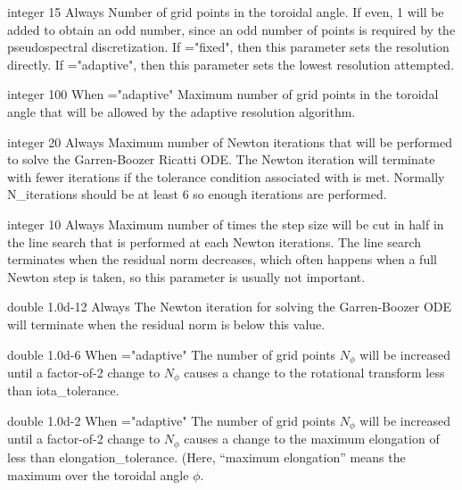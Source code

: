 \myhrule

{integer}
{15}
{Always}
{Number of grid points in the toroidal angle. If even, 1 will be added to obtain an odd number, since an odd number of points is required by the pseudospectral discretization. If ={\ttfamily "fixed"}, then this parameter sets the resolution directly. If ={\ttfamily "adaptive"}, then this parameter sets the lowest resolution attempted.}

\myhrule

{integer}
{100}
{When ={\ttfamily "adaptive"}}
{Maximum number of grid points in the toroidal angle that will be allowed by the adaptive resolution algorithm.}

\myhrule

{integer}
{20}
{Always}
{Maximum number of Newton iterations that will be performed to solve the Garren-Boozer Ricatti ODE.  The Newton iteration will terminate with fewer iterations if the tolerance condition associated with  is met. Normally {\ttfamily N\_iterations} should be at least 6 so enough iterations are performed.}

\myhrule

{integer}
{10}
{Always}
{Maximum number of times the step size will be cut in half in the line search that is performed at each Newton iterations. The line search terminates when the residual norm decreases, which often happens when a full Newton step is taken, so this parameter is usually not important.}

\myhrule

{double}
{1.0d-12}
{Always}
{The Newton iteration for solving the Garren-Boozer ODE will terminate when the residual norm is below this value.}

\myhrule

{double}
{1.0d-6}
{When ={\ttfamily "adaptive"}}
{The number of grid points $N_\phi$ will be increased until a factor-of-2 change to $N_\phi$ causes a change to the rotational transform less than {\ttfamily iota\_tolerance}.}

\myhrule

{double}
{1.0d-2}
{When ={\ttfamily "adaptive"}}
{The number of grid points $N_\phi$ will be increased until a factor-of-2 change to $N_\phi$ causes a change to the maximum elongation of less than {\ttfamily elongation\_tolerance}. (Here, ``maximum elongation'' means the maximum over the toroidal angle $\phi$.}

